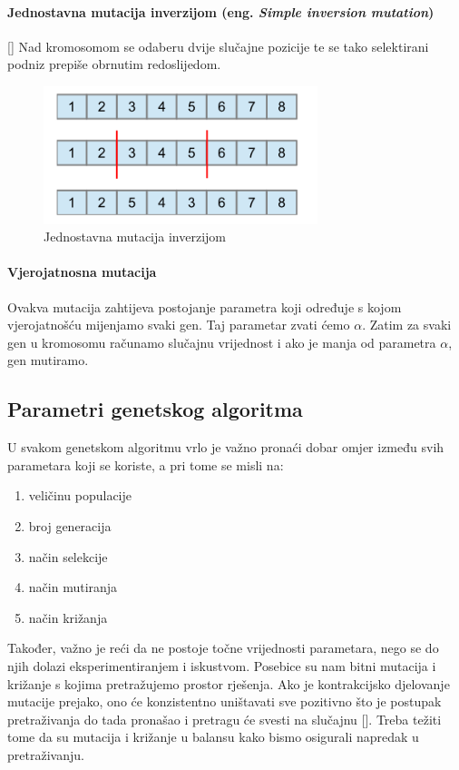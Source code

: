 \documentclass[times, utf8, zavrsni]{fer}
\begin{document}
	\paragraph{Jednostavna mutacija inverzijom (eng. \emph{Simple inversion mutation})}[\citep{Holland}]
	Nad kromosomom se odaberu dvije slučajne pozicije te se tako selektirani podniz prepiše obrnutim redoslijedom.
	
	
	\begin{figure}[!htb]
		\centering
		\includegraphics[width=8cm]{slike/SIM.png}
		\caption{Jednostavna mutacija inverzijom}
		\label{fig:inversion-mutation}
	\end{figure}
	
	\paragraph{Vjerojatnosna mutacija}
	
	Ovakva mutacija zahtijeva postojanje parametra koji određuje s kojom vjerojatnošću mijenjamo svaki gen. Taj parametar zvati ćemo \emph{$\alpha$}. Zatim za svaki gen u kromosomu računamo slučajnu vrijednost i ako je manja od parametra \emph{$\alpha$}, gen mutiramo. 
	
	\subsection{Parametri genetskog algoritma}
	
	U svakom genetskom algoritmu vrlo je važno pronaći dobar omjer između svih parametara koji se koriste, a pri tome se misli na:
	\begin{enumerate}
		\item veličinu populacije
		\item broj generacija
		\item način selekcije
		\item način mutiranja
		\item način križanja
	\end{enumerate}
	
	Također, važno je reći da ne postoje točne vrijednosti parametara, nego se do njih dolazi eksperimentiranjem i iskustvom. Posebice su nam bitni mutacija i križanje s kojima pretražujemo prostor rješenja. Ako je kontrakcijsko djelovanje mutacije prejako, ono će konzistentno uništavati sve pozitivno što je postupak pretraživanja do tada pronašao i pretragu će svesti na slučajnu [\citep{UI}]. Treba težiti tome da su mutacija i križanje u balansu kako bismo osigurali napredak u pretraživanju. 
	
\end{document}
